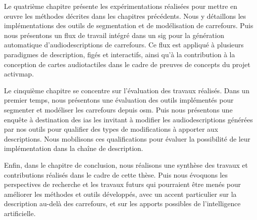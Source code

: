 \newpar{}

Le quatrième chapitre présente les expérimentations réalisées pour mettre en œuvre les méthodes décrites dans les chapitres précédents.
Nous y détaillons les implémentations des outils de segmentation et de modélisation de carrefours. Puis nous présentons un flux de travail intégré dans un \gls{sig} pour la génération automatique d'audiodescriptions de carrefours. Ce flux est appliqué à plusieurs paradigmes de description, figés et interactifs, ainsi qu'à la contribution à la conception de cartes audiotactiles dans le cadre de preuves de concepts du projet \gls{activmap}.

\newpar{}

Le cinquième chapitre se concentre sur l'évaluation des travaux réalisés. Dans un premier temps, nous présentons une évaluation des outils implémentés pour segmenter et modéliser les carrefours depuis \gls{osm}. Puis nous présentons une enquête à destination des \glspl{ia} les invitant à modifier les audiodescriptions générées par nos outils pour qualifier des types de modifications à apporter aux descriptions. Nous mobilisons ces qualifications pour évaluer la possibilité de leur implémentation dans la chaîne de description. 

\newpar{}

Enfin, dans le chapitre de conclusion, nous réalisons une synthèse des travaux et contributions réalisés dans le cadre de cette thèse. Puis nous évoquons les perspectives de recherche et les travaux futurs qui pourraient être menés pour améliorer les méthodes et outils développés, avec un accent particulier sur la description au-delà des carrefours, et sur les apports possibles de l'intelligence artificielle.
